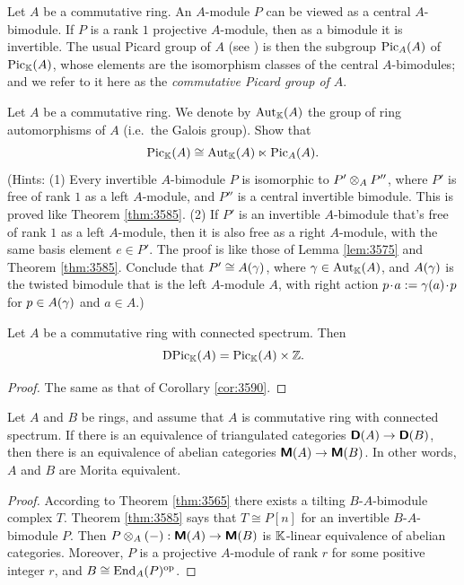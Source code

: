 Let $A$ be a commutative ring. An $A$-module $P$ can 
be viewed as a central $A$-bimodule. If $P$ is a rank $1$ projective 
$A$-module, then as a bimodule it is invertible. The usual Picard group of $A$
(see \cite[Section II.6]{Har})
is then the subgroup $\operatorname{Pic}_{A}(A)$ of $\operatorname{Pic}_{\mathbb{K}}(A)$, whose elements 
are the isomorphism classes of the central $A$-bimodules; and we refer to it 
here as the {\em commutative Picard group of $A$}. 

\begin{exer} \label{exer:3592}
Let $A$ be a commutative ring. We denote by $\operatorname{Aut}_{\mathbb{K}}(A)$ the group 
of ring automorphisms of $A$ (i.e.\ the Galois group). Show that 
\[ \operatorname{Pic}_{\mathbb{K}}(A) \cong \operatorname{Aut}_{\mathbb{K}}(A) \ltimes \operatorname{Pic}_{A}(A) . \]
(Hints: (1) Every invertible $A$-bimodule $P$ is isomorphic to 
$P' \otimes_A P''$, where $P'$ is free of rank $1$ as a left $A$-module, and 
$P''$ is a central invertible bimodule.
This is proved like Theorem \ref{thm:3585}. 
(2) If $P'$ is an invertible $A$-bimodule that's free of rank $1$ as a left 
$A$-module, then it is also free as a right $A$-module, with the same basis 
element $e \in P'$. The proof is like those of Lemma \ref{lem:3575} and Theorem 
\ref{thm:3585}. Conclude that $P' \cong A(\gamma)$, where 
$\gamma \in \operatorname{Aut}_{\mathbb{K}}(A)$, and $A(\gamma)$ is the twisted bimodule that is the
left $A$-module $A$, with right action 
$p \mspace{1.5mu}{\cdot}\mspace{1.5mu} a := \gamma(a) \mspace{1.5mu}{\cdot}\mspace{1.5mu} p$ for $p \in A(\gamma)$ and $a \in A$.)
\end{exer}

\begin{cor} \label{cor:3591} 
Let $A$ be a commutative ring with connected spectrum. Then 
\[ \operatorname{DPic}_{\mathbb{K}}(A) = \operatorname{Pic}_{\mathbb{K}}(A) \times \mathbb{Z} . \]
\end{cor}

\begin{proof}
The same as that of Corollary \ref{cor:3590}. 
\end{proof}

\begin{cor} \label{cor:3597} 
Let $A$ and $B$ be rings, and assume that $A$ is commutative ring with 
connected spectrum. 
If there is an equivalence of triangulated categories
$\boldsymbol{\mathsf{D}}(A) \to \boldsymbol{\mathsf{D}}(B)$, then there is an equivalence of 
abelian categories $\boldsymbol{\mathsf{M}}(A) \to \boldsymbol{\mathsf{M}}(B)$. In other words, $A$ and $B$ 
are Morita equivalent.
\end{cor}

\begin{proof}
According to Theorem \ref{thm:3565} there exists a tilting $B$-$A$-bimodule 
complex $T$. Theorem \ref{thm:3585} says that $T \cong P[n]$ for an 
invertible $B$-$A$-bimodule $P$. Then 
$P \otimes_A (-) : \boldsymbol{\mathsf{M}}(A) \to \boldsymbol{\mathsf{M}}(B)$ 
is $\mathbb{K}$-linear equivalence of abelian categories. 
Moreover, $P$ is a projective $A$-module of rank $r$ for some positive integer 
$r$, and 
$B \cong \operatorname{End}_A(P)^{\mathrm{op}}$. 
\end{proof}

